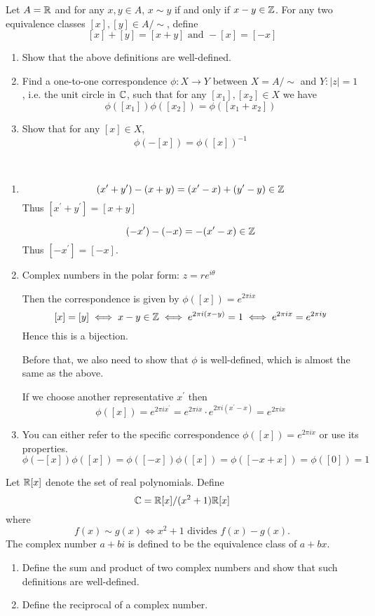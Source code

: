 \begin{prbm}
Let $A = \mathbb R$ and for any $x, y \in A$, $x \sim y$ if and only if $x-y \in \mathbb Z$. For any two equivalence classes $[x], [y] \in A/\sim$, define
\[ [x] + [y] = [x + y] \text{ and } -[x] = [-x] \]
\begin{enumerate}[label=(\alph*)]
\item Show that the above definitions are well-defined.
\item Find a one-to-one correspondence $\phi:X \to Y$ between $X = A/\sim$ and $Y:|z| = 1$, i.e. the unit circle in $\mathbb C$, such that for any $[x_1], [x_2] \in X$ we have
\[ \phi([x_1])\phi([x_2]) = \phi([x_1 + x_2]) \]
\item Show that for any $[x] \in X$,
\[ \phi(-[x]) = \phi([x])^{-1} \]
\end{enumerate}
\end{prbm}

\begin{solution} \ 
\begin{enumerate}[label=(\alph*)]
\item 
\[ (x^\prime+y^\prime)-(x+y)=(x^\prime-x)+(y^\prime-y)\in \mathbb Z \]
Thus $[x^\prime+y^\prime]=[x+y]$

\[ (-x^\prime)-(-x)=-(x^\prime-x)\in \mathbb Z \]
Thus $[-x^\prime]=[-x]$.

\item Complex numbers in the polar form: $z=re^{i\theta}$

Then the correspondence is given by $\phi([x])=e^{2\pi ix}$
\[ [x]=[y] \iff x-y\in \mathbb Z \iff e^{2\pi i(x-y)}=1 \iff e^{2\pi ix}=e^{2\pi iy} \]
Hence this is a bijection.

Before that, we also need to show that $\phi$ is well-defined, which is almost the same as the above.

If we choose another representative $x^\prime$ then
\[ \phi([x])=e^{2\pi ix^\prime} = e^{2\pi ix}\cdot e^{2\pi i(x^\prime-x)} = e^{2\pi ix} \]

\item You can either refer to the specific correspondence $\phi([x])=e^{2\pi ix}$ or use its properties.
\[ \phi(-[x])\phi([x]) = \phi([-x])\phi([x]) = \phi([-x+x]) = \phi([0]) = 1 \]
\end{enumerate}
\end{solution}
\pagebreak

\begin{prbm}
Let $\mathbb R[x]$ denote the set of real polynomials. Define
\[ \mathbb C=\mathbb R[x]/(x^2+1)\mathbb R[x] \]
where
\[ f(x)\sim g(x) \iff x^2+1 \text{ divides } f(x)-g(x). \]
The complex number $a+bi$ is defined to be the equivalence class of $a+bx$.
\begin{enumerate}[label=(\alph*)]
\item Define the sum and product of two complex numbers and show that such definitions are well-defined.
\item Define the reciprocal of a complex number.
\end{enumerate}
\end{prbm}
